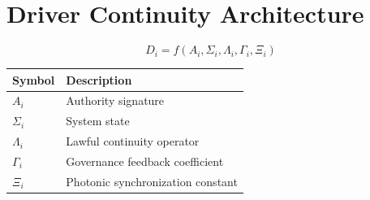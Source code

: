 \documentclass[10pt,a4paper]{article}
\begin{document}
\section{Driver Continuity Architecture}

\[
D_i = f(A_i, \Sigma_i, \Lambda_i, \Gamma_i, \Xi_i)
\]

\begin{center}
\begin{tabular}{ll}
\toprule
Symbol & Description \\
\midrule
\(A_i\) & Authority signature \\
\(\Sigma_i\) & System state \\
\(\Lambda_i\) & Lawful continuity operator \\
\(\Gamma_i\) & Governance feedback coefficient \\
\(\Xi_i\) & Photonic synchronization constant \\
\bottomrule
\end{tabular}
\end{center}
\end{document}

